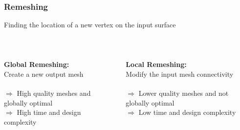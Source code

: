 \documentclass[aspectratio=43,sanserif,professionalfonts]{beamer}
\begin{document}
\begin{frame}
	\frametitle{Remeshing}
	\begin{tcolorbox}[colback=green!5,colframe=green!40!black,title=Correlation Problem]
		Finding the location of a new vertex on the input surface
	\end{tcolorbox}
	\pause
	\centering
	~\\
	\begin{columns}
		\begin{column}{0.5\textwidth}
			\textbf{Global Remeshing:}\\
			Create a new output mesh\\
			~\\
			{\color{mygreen} $\Rightarrow$ High quality meshes and globally optimal}\\
			{\color{red} $\Rightarrow$ High time and design complexity}
		\end{column}
		\begin{column}{0.5\textwidth}
			\textbf{Local Remeshing:}\\
			Modify the input mesh connectivity\\
			~\\
			{\color{red} $\Rightarrow$ Lower quality meshes and not globally optimal}\\
			{\color{mygreen} $\Rightarrow$ Low time and design complexity}
			\\~\\
		\end{column}
	\end{columns}
\end{frame}

\end{document}
